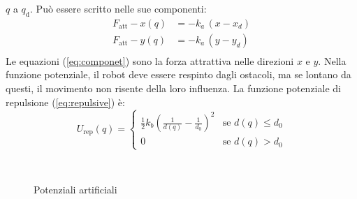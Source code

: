 $q$ a $q_{\text{d}}$. Può essere scritto nelle sue componenti:
\begin{equation}
\label{eq:componet}
\begin{split}
F_{\text{att}} -x(q) &= -k_a \, (x - x_d)\\
F_{\text{att}} -y(q) &= -k_a \, (y - y_d)\\
\end{split}
\end{equation}
%
Le equazioni (\ref{eq:componet}) sono la forza attrattiva nelle direzioni $x$ 
e $y$. Nella funzione potenziale, il robot deve essere respinto dagli ostacoli, 
ma se lontano da questi, il movimento non risente della loro influenza.
La funzione potenziale di repulsione (\ref{eq:repulsive}) è:
\begin{equation}
\label{eq:repulsive}
U_{\text{rep}}(q) = 
\begin{cases} 
\frac{1}{2}k_b(\frac{1}{d(q)}-\frac{1}{d_0})^2 &\mbox{se } d(q) \leq d_0 \\ 
0 & \mbox{se } d(q) > d_0
\end{cases} 
\end{equation}
\begin{figure}[!h]
\centering
{} \,
\caption{Potenziali artificiali}
\label{fig:potentialfield}
\end{figure}

